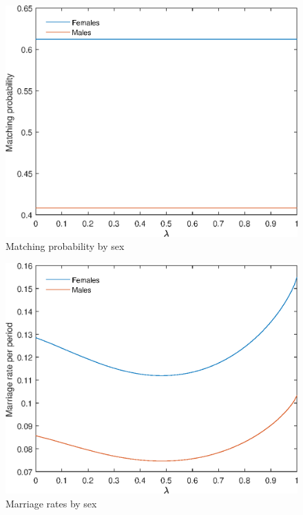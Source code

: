 \documentclass[12pt]{article}
\begin{document}
\begin{figure}
	\centering
	\caption{Matching probability by sex}
	\includegraphics{Graphs/match_prob_lambda_ex1.eps}
\end{figure}

\begin{figure}
	\centering
	\caption{Marriage rates by sex}
	\includegraphics{Graphs/marr_rates_lambda_ex1.eps}
\end{figure}
\end{document}
